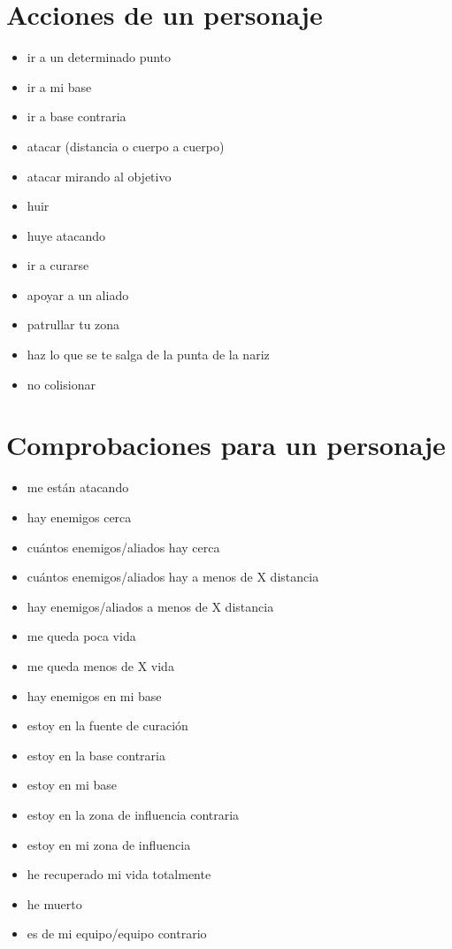 \documentclass[a4paper,10pt]{article}
\begin{document}
\section{Acciones de un personaje}
\begin{itemize}
 \item ir a un determinado punto
 \item ir a mi base
 \item ir a base contraria
 \item atacar (distancia o cuerpo a cuerpo)
 \item atacar mirando al objetivo
 \item huir
 \item huye atacando
 \item ir a curarse
 \item apoyar a un aliado
 \item patrullar tu zona
 \item haz lo que se te salga de la punta de la nariz
 \item no colisionar
\end{itemize}


\section{Comprobaciones para un personaje}
\begin{itemize}
 \item me están atacando
 \item hay enemigos cerca
 \item cuántos enemigos/aliados hay cerca
 \item cuántos enemigos/aliados hay a menos de X distancia
 \item hay enemigos/aliados a menos de X distancia
 \item me queda poca vida
 \item me queda menos de X vida
 \item hay enemigos en mi base
 \item estoy en la fuente de curación
 \item estoy en la base contraria
 \item estoy en mi base
 \item estoy en la zona de influencia contraria
 \item estoy en mi zona de influencia
 \item he recuperado mi vida totalmente
 \item he muerto
 \item es de mi equipo/equipo contrario
\end{itemize}
\end{document}

